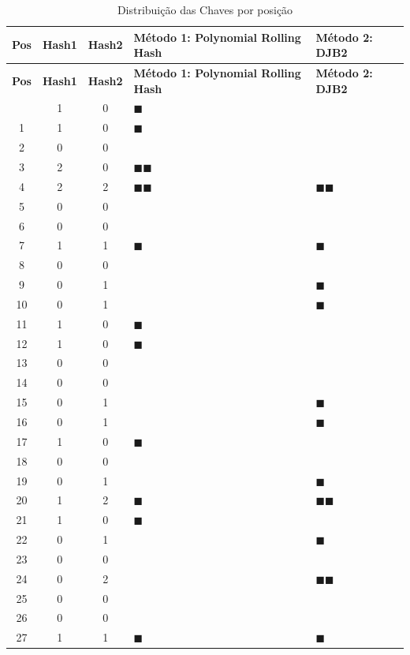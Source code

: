 \documentclass[12pt,a4paper]{abntex2}
\begin{document}
\begin{longtable}{|c|c|c|l|l|}
\caption{Distribuição das Chaves por posição}
\hline
\textbf{Pos} & \textbf{Hash1} & \textbf{Hash2} & \textbf{Método 1: Polynomial Rolling Hash} & \textbf{Método 2: DJB2} \\
\hline
\endfirsthead

\hline
\textbf{Pos} & \textbf{Hash1} & \textbf{Hash2} & \textbf{Método 1: Polynomial Rolling Hash} & \textbf{Método 2: DJB2} \\
\hline
\endhead

\hline
\endfoot
0  & 1 & 0 & $\blacksquare$ & \\
1  & 1 & 0 & $\blacksquare$ & \\
2  & 0 & 0 &   & \\
3  & 2 & 0 & $\blacksquare\blacksquare$ & \\
4  & 2 & 2 & $\blacksquare\blacksquare$ & $\blacksquare\blacksquare$ \\
5  & 0 & 0 &   & \\
6  & 0 & 0 &   & \\
7  & 1 & 1 & $\blacksquare$ & $\blacksquare$ \\
8  & 0 & 0 &   & \\
9  & 0 & 1 &   & $\blacksquare$ \\
10 & 0 & 1 &   & $\blacksquare$ \\
11 & 1 & 0 & $\blacksquare$ & \\
12 & 1 & 0 & $\blacksquare$ & \\
13 & 0 & 0 &   & \\
14 & 0 & 0 &   & \\
15 & 0 & 1 &   & $\blacksquare$ \\
16 & 0 & 1 &   & $\blacksquare$ \\
17 & 1 & 0 & $\blacksquare$ & \\
18 & 0 & 0 &   & \\
19 & 0 & 1 &   & $\blacksquare$ \\
20 & 1 & 2 & $\blacksquare$ & $\blacksquare\blacksquare$ \\
21 & 1 & 0 & $\blacksquare$ & \\
22 & 0 & 1 &   & $\blacksquare$ \\
23 & 0 & 0 &   & \\
24 & 0 & 2 &   & $\blacksquare\blacksquare$ \\
25 & 0 & 0 &   & \\
26 & 0 & 0 &   & \\
27 & 1 & 1 & $\blacksquare$ & $\blacksquare$ \\

\end{longtable}
\end{document}
